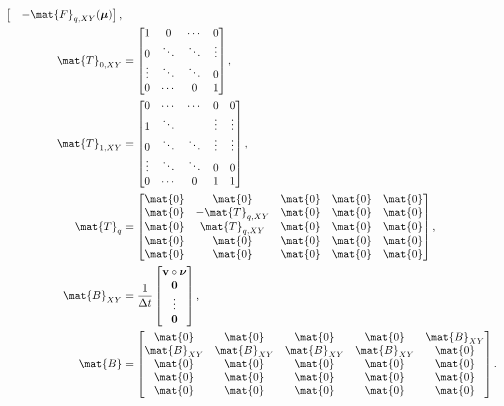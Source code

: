 \documentclass{jpmarticle}
\renewcommand{\vec}[1]{\boldsymbol{\mathrm{#1}}}
\let\subequationsorig\subequations%
\let\endsubequationsorig\endsubequations%
\renewenvironment{subequations}{
  \subequationsorig
  \renewcommand{\theequation}{\theparentequation.\arabic{equation}}
}{
  \endsubequationsorig
}
\begin{document}
\begin{subequations}
\begin{align}
\begin{bmatrix}
      & - \mat{F}_{q, XY}(\vec{\mu})
    \end{bmatrix},
    \\
    \mat{T}_{0, XY} &=
    \begin{bmatrix}
      1 & 0 & \cdots & 0
      \\
      0 & \ddots & \ddots & \vdots
      \\
      \vdots & \ddots & \ddots & 0
      \\
      0 & \cdots & 0 & 1
    \end{bmatrix},
    \\
    \mat{T}_{1, XY} &=
    \begin{bmatrix}
      0 & \cdots & \cdots & 0 & 0
      \\
      1 & \ddots & & \vdots & \vdots
      \\
      0 & \ddots & \ddots & \vdots & \vdots
      \\
      \vdots & \ddots & \ddots & 0 & 0
      \\
      0 & \cdots & 0 & 1 & 1
    \end{bmatrix},
    \\
    \mat{T}_q &=
    \begin{bmatrix}
      \mat{0} & \mat{0} & \mat{0} & \mat{0} & \mat{0}
      \\
      \mat{0} & - \mat{T}_{q, XY} & \mat{0} & \mat{0} & \mat{0}
      \\
      \mat{0} & \mat{T}_{q, XY} & \mat{0} & \mat{0} & \mat{0}
      \\
      \mat{0} & \mat{0} & \mat{0} & \mat{0} & \mat{0}
      \\
      \mat{0} & \mat{0} & \mat{0} & \mat{0} & \mat{0}
    \end{bmatrix},
    \\
    \mat{B}_{XY} &=
    \frac{1}{\Delta t}
    \begin{bmatrix}
      \vec{v} \circ \vec{\nu} \\ \vec{0} \\ \vdots \\ \vec{0}
    \end{bmatrix},
    \\
    \mat{B} &=
    \begin{bmatrix}
      \mat{0} & \mat{0} & \mat{0} & \mat{0} & \mat{B}_{XY}
      \\
      \mat{B}_{XY} & \mat{B}_{XY} & \mat{B}_{XY} & \mat{B}_{XY} & \mat{0}
      \\
      \mat{0} & \mat{0} & \mat{0} & \mat{0} & \mat{0}
      \\
      \mat{0} & \mat{0} & \mat{0} & \mat{0} & \mat{0}
      \\
      \mat{0} & \mat{0} & \mat{0} & \mat{0} & \mat{0}
    \end{bmatrix}.
  \end{align}
\end{subequations}
\end{document}
